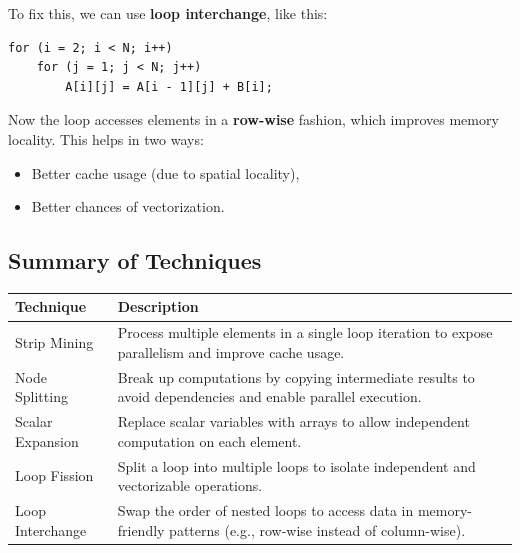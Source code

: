 \documentclass[12pt]{book}
\begin{document}
To fix this, we can use \textbf{loop interchange}, like this:

\begin{lstlisting}[style=cppstyle]
for (i = 2; i < N; i++)
    for (j = 1; j < N; j++)
        A[i][j] = A[i - 1][j] + B[i];
\end{lstlisting}

Now the loop accesses elements in a \textbf{row-wise} fashion, which improves memory locality. This helps in two ways:
\begin{itemize}
    \item Better cache usage (due to spatial locality),
    \item Better chances of vectorization.
\end{itemize}

\subsection{Summary of Techniques}

\begin{center}
\begin{tabular}{|l|p{10cm}|}
\hline
\textbf{Technique} & \textbf{Description} \\
\hline
Strip Mining & Process multiple elements in a single loop iteration to expose parallelism and improve cache usage. \\
\hline
Node Splitting & Break up computations by copying intermediate results to avoid dependencies and enable parallel execution. \\
\hline
Scalar Expansion & Replace scalar variables with arrays to allow independent computation on each element. \\
\hline
Loop Fission & Split a loop into multiple loops to isolate independent and vectorizable operations. \\
\hline
Loop Interchange & Swap the order of nested loops to access data in memory-friendly patterns (e.g., row-wise instead of column-wise). \\
\hline
\end{tabular}
\end{center}
\end{document}
